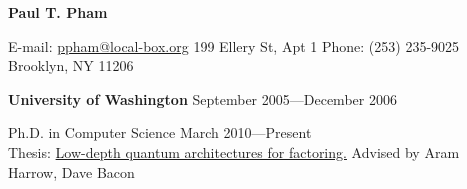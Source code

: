 \documentclass[letter]{article}
\begin{document}
\thispagestyle{empty}           %

\reversemarginpar		%

{\LARGE {\bf Paul T. Pham}}
\par
\vspace{.25in}
E-mail: \href{mailto:ppham@local-box.org}{ppham@local-box.org}
\hspace*{\fill}
199 Ellery St, Apt 1
\linebreak
Phone: (253) 235-9025
\hspace*{\fill}
Brooklyn, NY 11206

\par
\vspace{.25in}

{\bf University of Washington} \hspace*{\fill}September 2005---December 2006
\par
Ph.D. in Computer Science \hspace*{\fill}March 2010---Present\\
Thesis: \href{https://dl.acm.org/doi/book/10.5555/2604498}{Low-depth quantum architectures for factoring.} Advised by Aram Harrow, Dave Bacon\\
\vspace{0.5\baselineskip}
\end{document}
